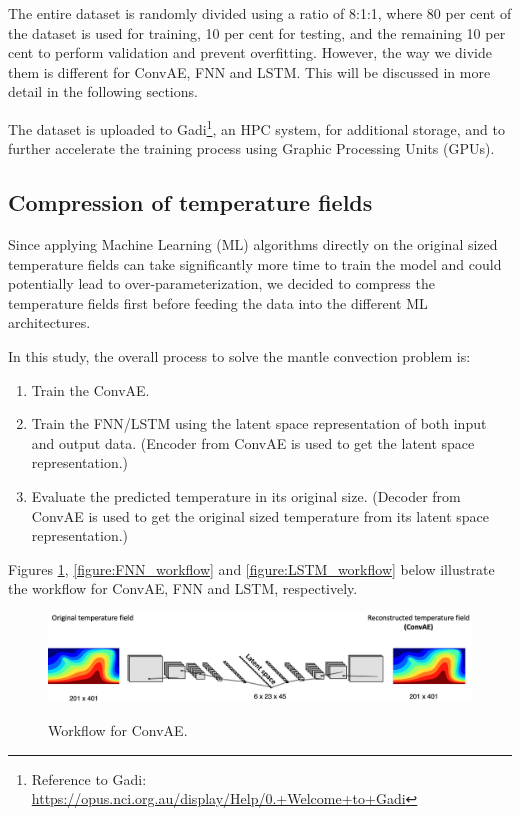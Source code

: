 The entire dataset is randomly divided using a ratio of 8:1:1, where 80 per cent of the dataset is used for training, 10 per cent for testing, and the remaining 10 per cent to perform validation and prevent overfitting. However, the way we divide them is different for ConvAE, FNN and LSTM. This will be discussed in more detail in the following sections.

The dataset is uploaded to Gadi\footnote{Reference to Gadi: \url{https://opus.nci.org.au/display/Help/0.+Welcome+to+Gadi}}, an HPC system, for additional storage, and to further accelerate the training process using Graphic Processing Units (GPUs).

\subsection{Compression of temperature fields}

Since applying Machine Learning (ML) algorithms directly on the original sized temperature fields can take significantly more time to train the model and could potentially lead to over-parameterization, we decided to compress the temperature fields first before feeding the data into the different ML architectures.

In this study, the overall process to solve the mantle convection problem is: 
\begin{enumerate}
  \item Train the ConvAE.
  \item Train the FNN/LSTM using the latent space representation of both input and output data. (Encoder from ConvAE is used to get the latent space representation.)
  \item Evaluate the predicted temperature in its original size. (Decoder from ConvAE is used to get the original sized temperature from its latent space representation.)
\end{enumerate}

Figures \ref{figure:ConvAE_workflow}, \ref{figure:FNN_workflow} and \ref{figure:LSTM_workflow} 
below illustrate the workflow for ConvAE, FNN and LSTM, respectively.

\begin{figure}[H]
    \centering
    \caption{Workflow for ConvAE.}
    \includegraphics[scale=0.3]{figures/mantle_convection_images/ConvAE_workflow.png}
    \label{figure:ConvAE_workflow}
\end{figure}


